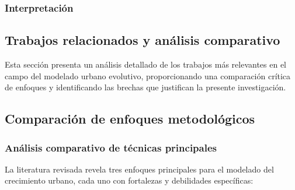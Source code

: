 \subsubsection{Interpretación}

\subsection{Trabajos relacionados y análisis comparativo}

Esta sección presenta un análisis detallado de los trabajos más relevantes en el campo del modelado urbano evolutivo, proporcionando una comparación crítica de enfoques y identificando las brechas que justifican la presente investigación.

\subsection{Comparación de enfoques metodológicos}

\subsubsection{Análisis comparativo de técnicas principales}

La literatura revisada revela tres enfoques principales para el modelado del crecimiento urbano, cada uno con fortalezas y debilidades específicas:

